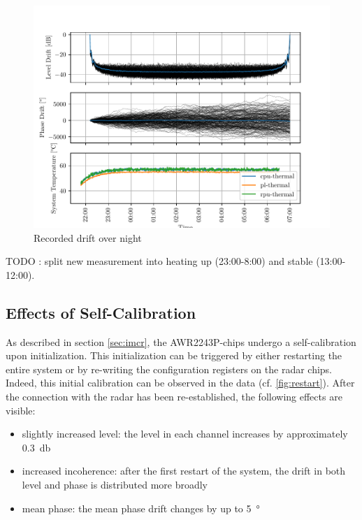 \begin{figure}
    \centering
    \includegraphics[width=\textwidth]{../figures/meas_24-02-16_phase_drift.pdf}
    \caption{Recorded drift over night}
    \label{fig:weekend}
\end{figure}
TODO : split new measurement into heating up (23:00-8:00) and stable (13:00-12:00).


\subsection{Effects of Self-Calibration}
As described in section \ref{sec:imcr}, the AWR2243P-chips undergo a self-calibration upon initialization.
This initialization can be triggered by either restarting the entire system 
or by re-writing the configuration registers on the radar chips.
Indeed, this initial calibration can be observed in the data (cf. \ref{fig:restart}).
After the connection with the radar has been re-established, the following effects are visible:
\begin{itemize}
    \item slightly increased level: the level in each channel increases by approximately \SI{0.3}{\decibel}
    \item increased incoherence: after the first restart of the system, the drift in both level and phase is distributed more broadly
    \item mean phase: the mean phase drift changes by up to \SI{5}{\degree}
\end{itemize}

